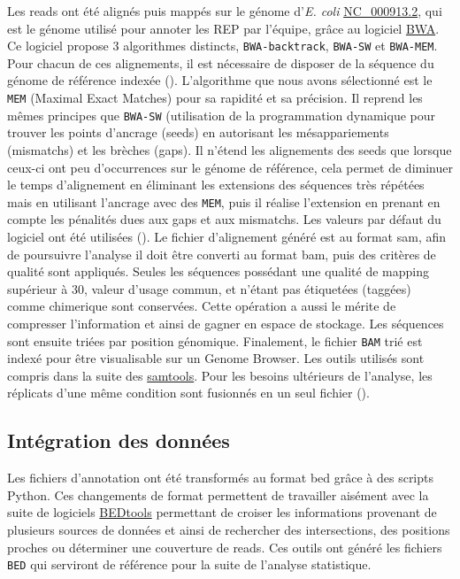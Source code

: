 \documentclass[12pt,a4paper]{report}
\begin{document}
\begin{onehalfspace}
Les reads ont été alignés puis mappés sur le génome d'\textit{E. coli} \href{http://www.ncbi.nlm.nih.gov/nuccore/NC_000913.2}{NC\_000913.2}, qui est le génome utilisé pour annoter les REP par l'équipe, grâce au logiciel \href{http://bio-bwa.sourceforge.net/}{BWA}.  Ce logiciel propose 3 algorithmes distincts, \texttt{BWA-backtrack}, \texttt{BWA-SW} et \texttt{BWA-MEM}. Pour chacun de ces alignements, il est nécessaire de disposer de la séquence du génome de référence indexée (). 
L'algorithme que nous avons sélectionné est le \texttt{MEM} (Maximal Exact Matches) pour sa rapidité et sa précision. Il reprend les mêmes principes que \texttt{BWA-SW} (utilisation de la programmation dynamique pour trouver les points d'ancrage (seeds) en autorisant les mésappariements (mismatchs) et les brèches (gaps). Il n'étend les alignements des seeds que lorsque ceux-ci ont peu d'occurrences sur le génome de référence, cela permet de diminuer le temps d'alignement en éliminant les extensions des séquences très répétées mais en utilisant l'ancrage avec des \texttt{MEM}, puis il réalise l'extension en prenant en compte les pénalités dues aux gaps et aux mismatchs. Les valeurs par défaut du logiciel ont été utilisées ().
Le fichier d'alignement généré est au format \gls{sam}, afin de poursuivre l'analyse il doit être converti au format \gls{bam}, puis des critères de qualité sont appliqués. Seules les séquences possédant une qualité de mapping supérieur à 30, valeur d'usage commun, et n'étant pas étiquetées (taggées) comme \gls{chimerique} sont conservées. Cette opération a aussi le mérite de compresser l'information et ainsi de gagner en espace de stockage. Les séquences sont ensuite triées par position génomique. Finalement, le fichier \texttt{BAM} trié est indexé pour être visualisable sur un Genome Browser. Les outils utilisés sont compris dans la suite des \href{http://samtools.sourceforge.net/samtools.shtml}{samtools}. Pour les besoins ultérieurs de l'analyse, les réplicats d'une même condition sont fusionnés en un seul fichier ().

\subsection*{Intégration des données}

Les fichiers d'annotation ont été transformés au format \gls{bed} grâce à des scripts Python.
Ces changements de format permettent de travailler aisément avec la suite de logiciels \href{http://bedtools.readthedocs.org/en/latest/}{BEDtools} permettant de croiser les informations provenant de plusieurs sources de données et ainsi de rechercher des intersections, des positions proches ou déterminer une \gls{couverture} de reads. Ces outils ont généré les fichiers \texttt{BED} qui serviront de référence pour la suite de l'analyse statistique.


\end{onehalfspace}
\end{document}
